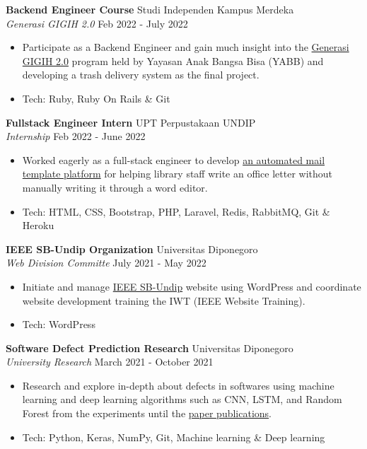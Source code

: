 \documentclass[a4paper]{article}
\begin{document}
\textbf{Backend Engineer Course} \hfill Studi Independen Kampus Merdeka \\
\textit{Generasi GIGIH 2.0} \hfill Feb 2022 - July 2022\\
\vspace{-1mm}
\begin{itemize} \itemsep 1pt
	\item Participate as a Backend Engineer and gain much insight into the \href{https://www.anakbangsabisa.org/generasi-gigih/}{Generasi GIGIH 2.0} program held by Yayasan Anak Bangsa Bisa (YABB) and developing a trash delivery system as the final project.
	\item Tech: Ruby, Ruby On Rails \& Git
\end{itemize}

\textbf{Fullstack Engineer Intern} \hfill UPT Perpustakaan UNDIP \\
\textit{Internship} \hfill Feb 2022 - June 2022\\
\vspace{-1mm}
\begin{itemize} \itemsep 1pt
	\item Worked eagerly as a full-stack engineer to develop \href{http://template-surat-testing.herokuapp.com/}{an automated mail template platform} for helping library staff write an office letter without manually writing it through a word editor.
	\item Tech: HTML, CSS, Bootstrap, PHP, Laravel, Redis, RabbitMQ, Git \& Heroku
\end{itemize}

\textbf{IEEE SB-Undip Organization} \hfill Universitas Diponegoro\\
\textit{Web Division Committe} \hfill July 2021 - May 2022\\
\vspace{-1mm}
\begin{itemize} \itemsep 1pt
	\item Initiate and manage \href{https://edu.ieee.org/id-undip/}{IEEE SB-Undip} website using WordPress and coordinate website development training the IWT (IEEE Website Training).
	\item Tech: WordPress
\end{itemize}

\textbf{Software Defect Prediction Research} \hfill Universitas Diponegoro\\
\textit{University Research} \hfill March 2021 - October 2021\\
\vspace{-1mm}
\begin{itemize} \itemsep 1pt
	\item Research and explore in-depth about defects in softwares using machine learning and deep learning algorithms such as CNN, LSTM, and Random Forest from the experiments until the
	\href{https://github.com/mhnaufal/Software-Defect-Finale/blob/main/reports/PAPER-Software%20Defect%20Prediction.pdf}{paper publications}.
	\item Tech: Python, Keras, NumPy, Git, Machine learning \& Deep learning
\end{itemize}
\end{document}
